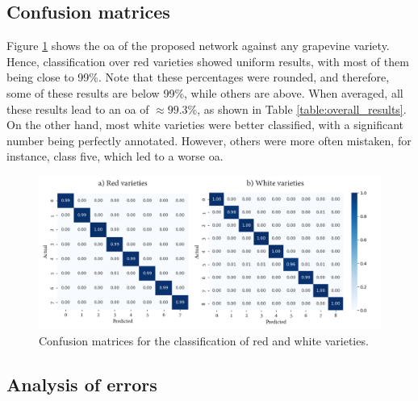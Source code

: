 \subsection{Confusion matrices}

Figure \ref{fig:confusion_matrices} shows the \acrshort{oa} of the proposed network against any grapevine variety. Hence, classification over red varieties showed uniform results, with most of them being close to 99\%. Note that these percentages were rounded, and therefore, some of these results are below 99\%, while others are above. When averaged, all these results lead to an \acrshort{oa} of $\approx99.3$\%, as shown in Table \ref{table:overall_results}. On the other hand, most white varieties were better classified, with a significant number being perfectly annotated. However, others were more often mistaken, for instance, class five, which led to a worse \acrshort{oa}.  

\begin{figure}[ht]
    \centering
    \includegraphics[width=\linewidth]{figs/vineyard_classification/confusion_matrices.png}
	\caption{Confusion matrices for the classification of red and white varieties. }
	\label{fig:confusion_matrices}
\end{figure} 

\subsection{Analysis of errors}

